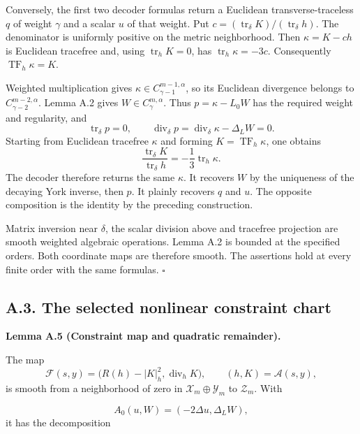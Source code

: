 \documentclass[
  english,
  11pt,
  reqno]{amsart}
\makeatletter
\newcommand{\pandocstatementheading}[1]{%
  \par\addpenalty{\@beginparpenalty}%
  \addvspace{.5\baselineskip plus .2\baselineskip minus .2\baselineskip}%
  {\normalfont\bfseries #1\par}%
  \nobreak\@afterindenttrue\@afterheading
}
\makeatother
\begin{document}
Conversely, the first two decoder formulas return a Euclidean
transverse-traceless \(q\) of weight \(\gamma\) and a scalar \(u\) of
that weight. Put
\(c=(\operatorname{tr}_\delta K)/(\operatorname{tr}_\delta h)\). The
denominator is uniformly positive on the metric neighborhood. Then
\(\kappa=K-ch\) is Euclidean tracefree and, using
\(\operatorname{tr}_hK=0\), has \(\operatorname{tr}_h\kappa=-3c\).
Consequently \(\operatorname{TF}_h\kappa=K\).

Weighted multiplication gives \(\kappa\in C^{m-1,\alpha}_{\gamma-1}\),
so its Euclidean divergence belongs to \(C^{m-2,\alpha}_{\gamma-2}\).
Lemma A.2 gives \(W\in C^{m,\alpha}_\gamma\). Thus \(p=\kappa-L_0W\) has
the required weight and regularity, and \[
\operatorname{tr}_\delta p=0,\qquad
\operatorname{div}_\delta p
=\operatorname{div}_\delta\kappa-\Delta_LW=0.
\] Starting from Euclidean tracefree \(\kappa\) and forming
\(K=\operatorname{TF}_h\kappa\), one obtains \[
\frac{\operatorname{tr}_\delta K}
{\operatorname{tr}_\delta h}
=-\frac13\operatorname{tr}_h\kappa.
\] The decoder therefore returns the same \(\kappa\). It recovers \(W\)
by the uniqueness of the decaying York inverse, then \(p\). It plainly
recovers \(q\) and \(u\). The opposite composition is the identity by
the preceding construction.

Matrix inversion near \(\delta\), the scalar division above and
tracefree projection are smooth weighted algebraic operations. Lemma A.2
is bounded at the specified orders. Both coordinate maps are therefore
smooth. The assertions hold at every finite order with the same
formulas. \hfill\(\square\)

\subsection{A.3. The selected nonlinear constraint
chart}\label{a.3.-the-selected-nonlinear-constraint-chart}\label{sec:online-chart-constraint-solution}

\pandocstatementheading{\leavevmode{}\label{lem:online-chart-constraint-remainder}Lemma A.5 (Constraint map and quadratic remainder).}

The map \[
\mathcal F(s,y)
=\bigl(R(h)-|K|_h^2,\operatorname{div}_hK\bigr),
\qquad (h,K)=\mathcal A(s,y),
\] is smooth from a neighborhood of zero in
\(\mathcal X_m\oplus\mathcal Y_m\) to \(\mathcal Z_m\). With

\label{eq:online-chart-flat-transverse-operator} \[
A_0(u,W)=(-2\Delta u,\Delta_LW),
\] it has the decomposition
\end{document}

